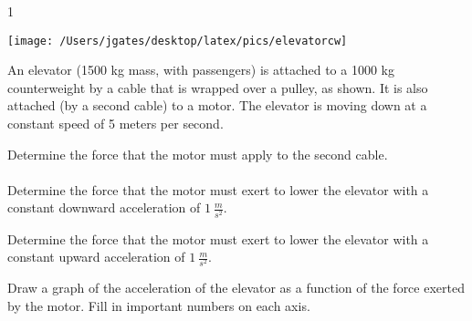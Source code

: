 
\AddToShipoutPicture*{\BackgroundPic}

\addtocounter {ProbNum} {1}

\begin{floatingfigure}[r]{.2\textwidth}
\texttt{[image: /Users/jgates/desktop/latex/pics/elevatorcw]}
\end{floatingfigure}
 
{\bf \Large{}} An elevator (1500 kg mass, with passengers) is attached to a 1000 kg counterweight by a cable that is wrapped over a pulley, as shown.  It is also attached (by a second cable) to a motor.  The elevator is moving down at a constant speed of 5 meters per second.

\bigskip
Determine the force that the motor must apply to the second cable.
\paragraph{}
\noindent
\vfill
\vfill

Determine the force that the motor must exert to lower the elevator with a constant downward acceleration of ${1~\tfrac{m}{s^2}}$.

\vfill
\vfill
Determine the force that the motor must exert to lower the elevator with a constant upward acceleration of  ${1~\tfrac{m}{s^2}}$.

\vfill
Draw a graph of the acceleration of the elevator as a function of the force exerted by the motor.  Fill in important numbers on each axis.

\vfill
\vfill
\newpage